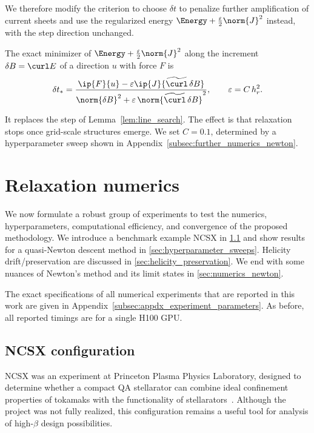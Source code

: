 \documentclass[%
 reprint,
 superscriptaddress,
 amsmath,amssymb,
 aps, nofootinbib, floatfix]{revtex4-2}
\begin{document}
We therefore modify the criterion to choose $\delta t$ to penalize further amplification of current sheets and use the regularized energy $\Energy + \tfrac{\varepsilon}{2} \norm{J}^2$ instead, with the step direction unchanged.
\begin{lemma}
    \label{lem:regularised_line_search}
    The exact minimizer of $\Energy + \frac{\varepsilon}{2} \norm{J}^2$ along the increment $\delta B = \curl E$ of a direction $u$ with force $F$ is
\begin{align}
    \label{eq:regularised_step}
    \delta t_\ast = \frac{\ip{F}{u} - \varepsilon \ip{J}{\widetilde{\curl} \, \delta B}}{\norm{\delta B}^2 + \varepsilon \, \norm{\widetilde{\curl} \, \delta B}^2}, \qquad \varepsilon = C \, h_r^2 .   
\end{align}
\end{lemma}
It replaces the step of Lemma~\ref{lem:line_search}. The effect is that relaxation stops once grid-scale structures emerge. We set $C = 0.1$, determined by a hyperparameter sweep shown in Appendix~\ref{subsec:further_numerics_newton}.

\section{Relaxation numerics}
\label{sec:numerics_II_relaxation}
We now formulate a robust group of experiments to test the numerics, hyperparameters, computational efficiency, and convergence of the proposed methodology. We introduce a benchmark example NCSX in \ref{sec:ncsx_configuration} and show results for a quasi-Newton descent method in \ref{sec:hyperparameter_sweeps}. Helicity drift/preservation are discussed in \ref{sec:helicity_preservation}. We end with some nuances of Newton's method and its limit states in \ref{sec:numerics_newton}.

The exact specifications of all numerical experiments that are reported in this work are given in Appendix~\ref{subsec:appdx_experiment_parameters}. As before, all reported timings are for a single H100 GPU.

\subsection{NCSX configuration} \label{sec:ncsx_configuration}
NCSX was an experiment at Princeton Plasma Physics Laboratory, designed to determine whether a compact QA stellarator can combine ideal confinement properties of tokamaks with the functionality of stellarators~\cite{Zarnstorff2001}.
 Although the project was not fully realized, this configuration remains a useful tool for analysis of high-$\beta$ design possibilities. 
\end{document}
